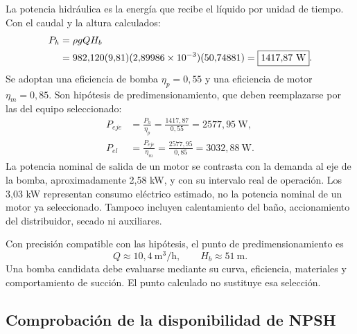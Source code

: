 La potencia hidráulica es la energía que recibe el líquido por unidad
de tiempo. Con el caudal y la altura calculados:
\begin{align}
 P_h&=\rho gQH_b\notag\\
 &=982{,}120(9{,}81)(2{,}89986\times10^{-3})(50{,}74881)
 =\boxed{1417{,}87\ \mathrm{W}}.
 \label{eq:man-asp-ph}
\end{align}
Se adoptan una eficiencia de bomba $\eta_p=0{,}55$ y una eficiencia
de motor $\eta_m=0{,}85$. Son hipótesis de predimensionamiento, que
deben reemplazarse por las del equipo seleccionado:
\begin{align}
 P_{eje}&=\frac{P_h}{\eta_p}
 =\frac{1417{,}87}{0{,}55}=\boxed{2577{,}95\ \mathrm{W}},\\
 P_{el}&=\frac{P_{eje}}{\eta_m}
 =\frac{2577{,}95}{0{,}85}=\boxed{3032{,}88\ \mathrm{W}}.
 \label{eq:man-asp-pel}
\end{align}
La potencia nominal de salida de un motor se contrasta con la demanda
al eje de la bomba, aproximadamente 2,58 kW, y con su intervalo real
de operación. Los 3,03 kW representan consumo eléctrico estimado,
no la potencia nominal de un motor ya seleccionado. Tampoco incluyen
calentamiento del baño, accionamiento del distribuidor, secado ni auxiliares.

Con precisión compatible con las hipótesis, el punto de predimensionamiento es
\begin{equation}
 \boxed{Q\approx10{,}4\ \mathrm{m^3/h},\qquad H_b\approx51\ \mathrm{m}}.
 \label{eq:man-asp-punto}
\end{equation}
Una bomba candidata debe evaluarse mediante su curva, eficiencia,
materiales y comportamiento de succión. El punto calculado no sustituye
esa selección.

\subsection{Comprobación de la disponibilidad de NPSH}
\label{sec:man-asp-npsh}

